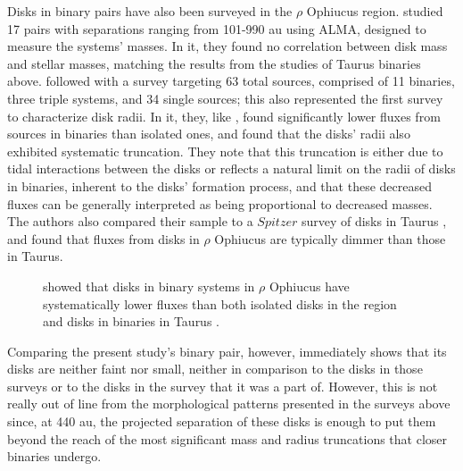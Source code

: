 Disks in binary pairs have also been surveyed in the $\rho$ Ophiucus region. \citet{Akeson2014} studied 17 pairs with separations ranging from 101-990 au using ALMA, designed to measure the systems' masses. In it, they found no correlation between disk mass and stellar masses, matching the results from the studies of Taurus binaries above. \citet{Cox2017} followed with a survey targeting 63 total sources, comprised of 11 binaries, three triple systems, and 34 single sources; this also represented the first survey to characterize disk radii. In it, they, like \citet{Harris2012,Akeson2019}, found significantly lower fluxes from sources in binaries than isolated ones, and found that the disks' radii also exhibited systematic truncation. They note that this truncation is either due to tidal interactions between the disks or reflects a natural limit on the radii of disks in binaries, inherent to the disks' formation process, and that these decreased fluxes can be generally interpreted as being proportional to decreased masses. The authors also compared their sample to a $Spitzer$ survey of disks in Taurus \citep{Rebull2012 REWORK GET THIS REF}, and found that fluxes from disks in $\rho$ Ophiucus are typically dimmer than those in Taurus.


 \begin{figure}[t]
   \hspace*{\fill}%
   \hspace*{\fill}%
   \caption{\citet{Cox2017} showed that disks in binary systems in $\rho$ Ophiucus have systematically lower fluxes than both isolated disks in the region and disks in binaries in Taurus \citep[from]{Harris2012}.}
   \label{fig:rhoOph_binaries}
 \end{figure}



Comparing the present study's binary pair, however, immediately shows that its disks are neither faint nor small, neither in comparison to the disks in those surveys or to the disks in the survey that it was a part of. However, this is not really out of line from the morphological patterns presented in the surveys above since, at 440 au, the projected separation of these disks is enough to put them beyond the reach of the most significant mass and radius truncations that closer binaries undergo.






